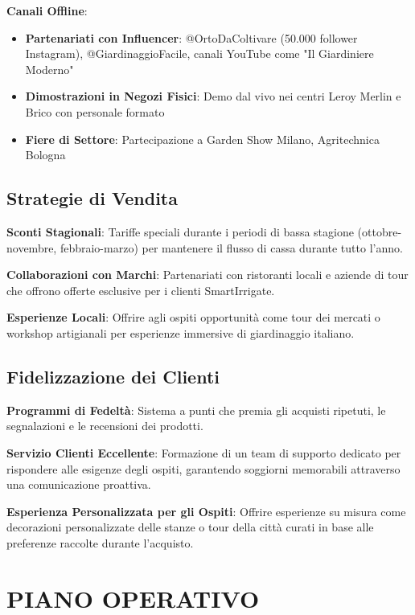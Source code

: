 \documentclass[11pt,a4paper]{report}
\begin{document}
\textbf{Canali Offline}:
\begin{itemize}
    \item \textbf{Partenariati con Influencer}: @OrtoDaColtivare (50.000 follower Instagram), @GiardinaggioFacile, canali YouTube come "Il Giardiniere Moderno"
    \item \textbf{Dimostrazioni in Negozi Fisici}: Demo dal vivo nei centri Leroy Merlin e Brico con personale formato
    \item \textbf{Fiere di Settore}: Partecipazione a Garden Show Milano, Agritechnica Bologna
\end{itemize}

\section{Strategie di Vendita}
\textbf{Sconti Stagionali}: Tariffe speciali durante i periodi di bassa stagione (ottobre-novembre, febbraio-marzo) per mantenere il flusso di cassa durante tutto l'anno.

\textbf{Collaborazioni con Marchi}: Partenariati con ristoranti locali e aziende di tour che offrono offerte esclusive per i clienti SmartIrrigate.

\textbf{Esperienze Locali}: Offrire agli ospiti opportunità come tour dei mercati o workshop artigianali per esperienze immersive di giardinaggio italiano.

\section{Fidelizzazione dei Clienti}
\textbf{Programmi di Fedeltà}: Sistema a punti che premia gli acquisti ripetuti, le segnalazioni e le recensioni dei prodotti.

\textbf{Servizio Clienti Eccellente}: Formazione di un team di supporto dedicato per rispondere alle esigenze degli ospiti, garantendo soggiorni memorabili attraverso una comunicazione proattiva.

\textbf{Esperienza Personalizzata per gli Ospiti}: Offrire esperienze su misura come decorazioni personalizzate delle stanze o tour della città curati in base alle preferenze raccolte durante l'acquisto.

\chapter{PIANO OPERATIVO}
\end{document}
